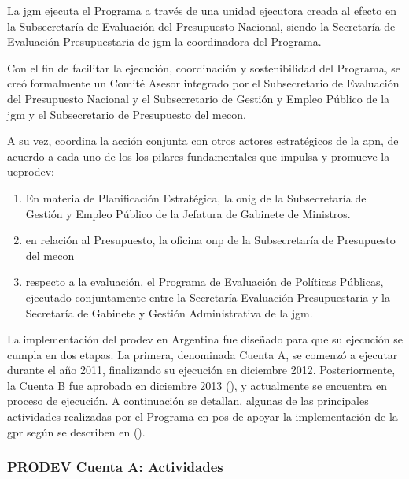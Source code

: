 La \ac{jgm} ejecuta el Programa a través de una unidad ejecutora creada al efecto en la Subsecretaría de Evaluación del Presupuesto Nacional, siendo la Secretaría de Evaluación Presupuestaria de \ac{jgm} la coordinadora del Programa.

Con el fin de facilitar la ejecución, coordinación y sostenibilidad del Programa, se creó formalmente un Comité Asesor integrado por el Subsecretario de Evaluación del Presupuesto Nacional y el Subsecretario de Gestión y Empleo Público de la \ac{jgm} y el Subsecretario de Presupuesto del \ac{mecon}.

A su vez, coordina la acción conjunta con otros actores estratégicos de la \ac{apn}, de acuerdo a cada uno de los los pilares fundamentales que impulsa y promueve la \ac{ueprodev}:

    \begin{enumerate}
        \item En materia de Planificación Estratégica, la \ac{onig} de la Subsecretaría de Gestión y Empleo Público de la Jefatura de Gabinete de Ministros.
        \item en relación al Presupuesto, la oficina \ac{onp} de la Subsecretaría de  Presupuesto del \ac{mecon}
        \item respecto a la evaluación, el Programa de Evaluación de Políticas Públicas, ejecutado conjuntamente entre la Secretaría Evaluación Presupuestaria y la Secretaría de Gabinete y Gestión Administrativa de la \ac{jgm}. 
    \end{enumerate}

La implementación del \ac{prodev} en Argentina fue diseñado para que su ejecución se cumpla en dos etapas. La primera, denominada Cuenta A, se comenzó a ejecutar durante el año 2011, finalizando su ejecución en diciembre 2012. Posteriormente, la Cuenta B fue aprobada en diciembre 2013 (\cite{cartaprodevb}), y actualmente se encuentra en proceso de ejecución. A continuación se detallan, algunas de las principales actividades realizadas por el Programa en pos de apoyar la implementación de la \ac{gpr} según se describen en  (\citeyear{informegestionprodev}).

\subsubsection{PRODEV Cuenta A: Actividades}

